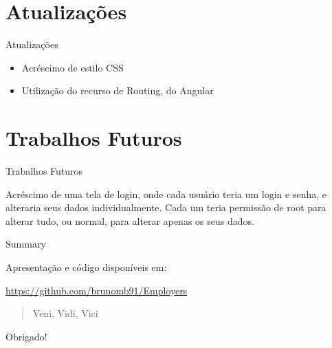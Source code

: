\documentclass[10pt]{beamer}
\begin{document}
\section{Atualizações}
\begin{frame}{Atualizações}
    
    \begin{itemize}
        \item Acréscimo de estilo CSS
	    \item Utilização do recurso de Routing, do Angular 
    \end{itemize}
	
\end{frame}


\section{Trabalhos Futuros}
\begin{frame}{Trabalhos Futuros}
    
        Acréscimo de uma tela de login, onde cada usuário teria um login e senha, e alteraria seus dados individualmente. 
        Cada um teria permissão de root para alterar tudo, ou normal, para alterar apenas os seus dados.
    
\end{frame}

\begin{frame}{Summary}

  Apresentação e código disponíveis em:

  \begin{center}\url{https://github.com/brunomb91/Employers}\end{center}

\end{frame}

\begin{frame}
  \begin{quote}
    Veni, Vidi, Vici
  \end{quote}
\end{frame}

{
\begin{frame}[standout]
  Obrigado!
\end{frame}
}
\end{document}
